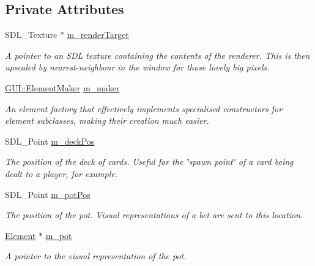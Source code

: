 \subsection*{Private Attributes}
\begin{DoxyCompactItemize}
\item 
S\-D\-L\-\_\-\-Texture $\ast$ \hyperlink{classGUI_1_1DealerGUI_aac251d3fe040ccb08cb174a13ef68a35}{m\-\_\-render\-Target}
\begin{DoxyCompactList}\small\item\em A pointer to an S\-D\-L texture containing the contents of the renderer. This is then upscaled by nearest-\/neighbour in the window for those lovely big pixels. \end{DoxyCompactList}\item 
\hyperlink{classGUI_1_1ElementMaker}{G\-U\-I\-::\-Element\-Maker} \hyperlink{classGUI_1_1DealerGUI_a0e798f7e0f7cb249e24b9687e9e79e1d}{m\-\_\-maker}
\begin{DoxyCompactList}\small\item\em An element factory that effectively implements specialised constructors for element subclasses, making their creation much easier. \end{DoxyCompactList}\item 
S\-D\-L\-\_\-\-Point \hyperlink{classGUI_1_1DealerGUI_ab7cd52bf63f7eca7d1726e11e1b8100e}{m\-\_\-deck\-Pos}
\begin{DoxyCompactList}\small\item\em The position of the deck of cards. Useful for the \char`\"{}spawn point\char`\"{} of a card being dealt to a player, for example. \end{DoxyCompactList}\item 
S\-D\-L\-\_\-\-Point \hyperlink{classGUI_1_1DealerGUI_a4084246f33414f6c1e882fdb8c288746}{m\-\_\-pot\-Pos}
\begin{DoxyCompactList}\small\item\em The position of the pot. Visual representations of a bet are sent to this location. \end{DoxyCompactList}\item 
\hyperlink{classGUI_1_1Element}{Element} $\ast$ \hyperlink{classGUI_1_1DealerGUI_a9292267bd8cf7df3e997936304258855}{m\-\_\-pot}
\begin{DoxyCompactList}\small\item\em A pointer to the visual representation of the pot. \end{DoxyCompactList}\item 

\end{DoxyCompactItemize}

